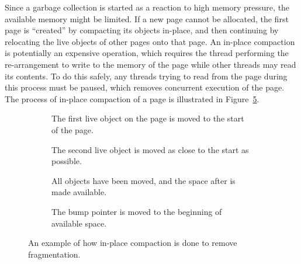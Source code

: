 Since a garbage collection is started as a reaction to high memory pressure, the available memory might be limited. If a new page cannot be allocated, the first page is ``created'' by compacting its objects in-place, and then continuing by relocating the live objects of other pages onto that page. An in-place compaction is potentially an expensive operation, which requires the thread performing the re-arrangement to write to the memory of the page while other threads may read its contents. To do this safely, any threads trying to read from the page during this process must be paused, which removes concurrent execution of the page. The process of in-place compaction of a page is illustrated in Figure~\ref{fig:zrel_in}.

\begin{figure}[H]
    \centering
    \begin{subfigure}[t]{.2\textwidth}
        \centering
        
        \caption{The first live object on the page is moved to the start of the page.}
        \label{fig:zrel_in1}
    \end{subfigure}
    \hfill\vline\hfill
    \begin{subfigure}[t]{.2\textwidth}
        \centering
        
        \caption{The second live object is moved as close to the start as possible.}
        \label{fig:zrel_in1}
    \end{subfigure}
    \hfill\vline\hfill
    \begin{subfigure}[t]{.2\textwidth}
        \centering
        
        \caption{All objects have been moved, and the space after is made available.}
        \label{fig:zrel_in1}
    \end{subfigure}
    \hfill\vline\hfill
    \begin{subfigure}[t]{.2\textwidth}
        \centering
        
        \caption{The bump pointer is moved to the beginning of available space.}
        \label{fig:zrel_in1}
    \end{subfigure}
    \caption{An example of how in-place compaction is done to remove fragmentation.}
    \label{fig:zrel_in}
\end{figure}


